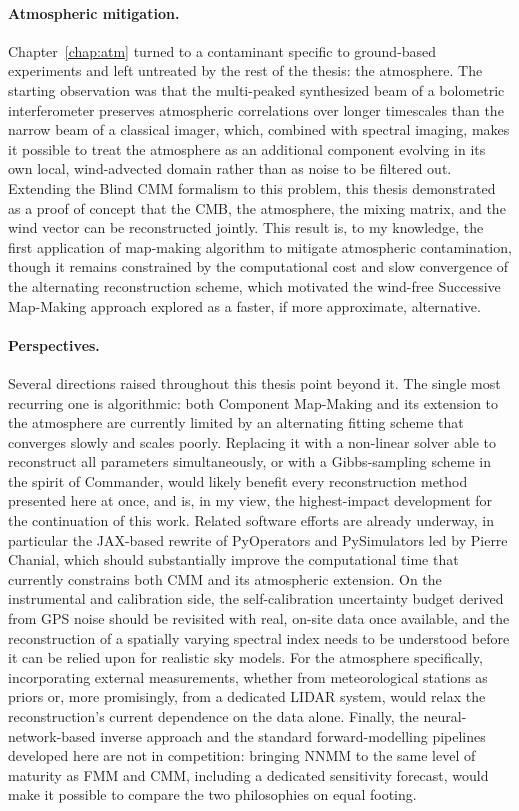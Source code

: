 \documentclass[../../thesis.tex]{subfiles}
\begin{document}
\paragraph{Atmospheric mitigation.}
Chapter~\ref{chap:atm} turned to a contaminant specific to ground-based experiments and left untreated by the rest of the thesis: the atmosphere. The starting observation was that the multi-peaked synthesized beam of a bolometric interferometer preserves atmospheric correlations over longer timescales than the narrow beam of a classical imager, which, combined with spectral imaging, makes it possible to treat the atmosphere as an additional component evolving in its own local, wind-advected domain rather than as noise to be filtered out. Extending the Blind CMM formalism to this problem, this thesis demonstrated as a proof of concept that the CMB, the atmosphere, the mixing matrix, and the wind vector can be reconstructed jointly. This result is, to my knowledge, the first application of map-making algorithm to mitigate atmospheric contamination, though it remains constrained by the computational cost and slow convergence of the alternating reconstruction scheme, which motivated the wind-free Successive Map-Making approach explored as a faster, if more approximate, alternative.

\paragraph{Perspectives.}
Several directions raised throughout this thesis point beyond it. The single most recurring one is algorithmic: both Component Map-Making and its extension to the atmosphere are currently limited by an alternating fitting scheme that converges slowly and scales poorly. Replacing it with a non-linear solver able to reconstruct all parameters simultaneously, or with a Gibbs-sampling scheme in the spirit of Commander, would likely benefit every reconstruction method presented here at once, and is, in my view, the highest-impact development for the continuation of this work. Related software efforts are already underway, in particular the JAX-based rewrite of PyOperators and PySimulators led by Pierre Chanial, which should substantially improve the computational time that currently constrains both CMM and its atmospheric extension. On the instrumental and calibration side, the self-calibration uncertainty budget derived from GPS noise should be revisited with real, on-site data once available, and the reconstruction of a spatially varying spectral index needs to be understood before it can be relied upon for realistic sky models. For the atmosphere specifically, incorporating external measurements, whether from meteorological stations as priors or, more promisingly, from a dedicated LIDAR system, would relax the reconstruction's current dependence on the data alone. Finally, the neural-network-based inverse approach and the standard forward-modelling pipelines developed here are not in competition: bringing NNMM to the same level of maturity as FMM and CMM, including a dedicated sensitivity forecast, would make it possible to compare the two philosophies on equal footing.
\end{document}
